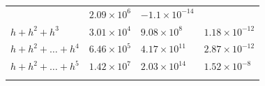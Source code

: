 \documentclass[
]{article}
\begin{document}
\begin{longtable}[]{@{}llll@{}}
\begin{minipage}[t]{0.16\columnwidth}
\end{minipage} & \begin{minipage}[t]{0.16\columnwidth}\raggedright
\(2.09 \times 10^{6}\)\strut
\end{minipage} & \begin{minipage}[t]{0.40\columnwidth}\raggedright
\(-1.1 \times 10^{-14}\)\strut
\end{minipage}\tabularnewline
\begin{minipage}[t]{0.17\columnwidth}\raggedright
\(h+h^{2}+h^{3}\)\strut
\end{minipage} & \begin{minipage}[t]{0.16\columnwidth}\raggedright
\(3.01 \times 10^{4}\)\strut
\end{minipage} & \begin{minipage}[t]{0.16\columnwidth}\raggedright
\(9.08 \times 10^{8}\)\strut
\end{minipage} & \begin{minipage}[t]{0.40\columnwidth}\raggedright
\(1.18 \times 10^{-12}\)\strut
\end{minipage}\tabularnewline
\begin{minipage}[t]{0.17\columnwidth}\raggedright
\(h+h^{2}+\dots+h^{4}\)\strut
\end{minipage} & \begin{minipage}[t]{0.16\columnwidth}\raggedright
\(6.46 \times 10^{5}\)\strut
\end{minipage} & \begin{minipage}[t]{0.16\columnwidth}\raggedright
\(4.17 \times 10^{11}\)\strut
\end{minipage} & \begin{minipage}[t]{0.40\columnwidth}\raggedright
\(2.87 \times 10^{-12}\)\strut
\end{minipage}\tabularnewline
\begin{minipage}[t]{0.17\columnwidth}\raggedright
\(h+h^{2}+\dots+h^{5}\)\strut
\end{minipage} & \begin{minipage}[t]{0.16\columnwidth}\raggedright
\(1.42 \times 10^{7}\)\strut
\end{minipage} & \begin{minipage}[t]{0.16\columnwidth}\raggedright
\(2.03 \times 10^{14}\)\strut
\end{minipage} & \begin{minipage}[t]{0.40\columnwidth}\raggedright
\(1.52 \times 10^{-8}\)\strut
\end{minipage}\tabularnewline
\begin{minipage}[t]{0.17\columnwidth}\raggedright

\end{minipage}
\end{longtable}
\end{document}
